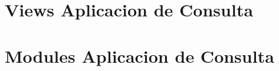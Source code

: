 \documentclass[letterpaper,10pt,spanish]{sphinxmanual}
\begin{document}
\section{Views Aplicacion de Consulta}
\label{\detokenize{modules/consulta/views:module-consulta.views}}\label{\detokenize{modules/consulta/views:views-aplicacion-de-consulta}}\label{\detokenize{modules/consulta/views::doc}}

\begin{fulllineitems}
\label{\detokenize{modules/consulta/views:consulta.views.ConsultaList}}
\end{fulllineitems}



\section{Modules Aplicacion de Consulta}
\label{\detokenize{modules/consulta/models:module-consulta.models}}\label{\detokenize{modules/consulta/models:modules-aplicacion-de-consulta}}\label{\detokenize{modules/consulta/models::doc}}
\end{document}

